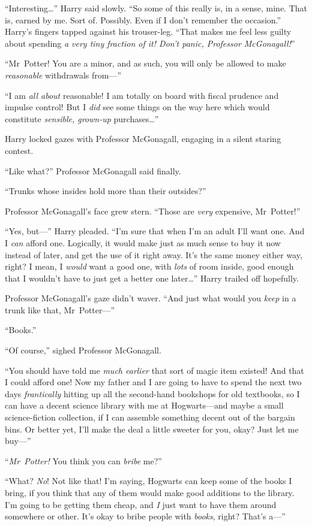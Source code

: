 “Interesting…” Harry said slowly. “So some of this really is, in a sense, mine. That is, earned by me. Sort of. Possibly. Even if I don’t remember the occasion.” Harry’s fingers tapped against his trouser-leg. “That makes me feel less guilty about spending \emph{a very tiny fraction of it! Don’t panic, Professor McGonagall!}”

“Mr~Potter! You are a minor, and as such, you will only be allowed to make \emph{reasonable} withdrawals from—”

“I am \emph{all about} reasonable! I am totally on board with fiscal prudence and impulse control! But I \emph{did} see some things on the way here which would constitute \emph{sensible, grown-up} purchases…”

Harry locked gazes with Professor McGonagall, engaging in a silent staring contest.

“Like what?” Professor McGonagall said finally.

“Trunks whose insides hold more than their outsides?”

Professor McGonagall’s face grew stern. “Those are \emph{very} expensive, Mr~Potter!”

“Yes, but—” Harry pleaded. “I’m sure that when I’m an adult I’ll want one. And I \emph{can} afford one. Logically, it would make just as much sense to buy it now instead of later, and get the use of it right away. It’s the same money either way, right? I mean, I \emph{would} want a good one, with \emph{lots} of room inside, good enough that I wouldn’t have to just get a better one later…” Harry trailed off hopefully.

Professor McGonagall’s gaze didn’t waver. “And just what would you \emph{keep} in a trunk like that, Mr~Potter—”

“Books.”

“Of course,” sighed Professor McGonagall.

“You should have told me \emph{much earlier} that sort of magic item existed! And that I could afford one! Now my father and I are going to have to spend the next two days \emph{frantically} hitting up all the second-hand bookshops for old textbooks, so I can have a decent science library with me at Hogwarts—and maybe a small science-fiction collection, if I can assemble something decent out of the bargain bins. Or better yet, I’ll make the deal a little sweeter for you, okay? Just let me buy—”

“\emph{Mr~Potter!} You think you can \emph{bribe} me?”

“What? \emph{No}! Not like that! I’m saying, Hogwarts can keep some of the books I bring, if you think that any of them would make good additions to the library. I’m going to be getting them cheap, and \emph{I} just want to have them around somewhere or other. It’s okay to bribe people with \emph{books}, right? That’s a—”

